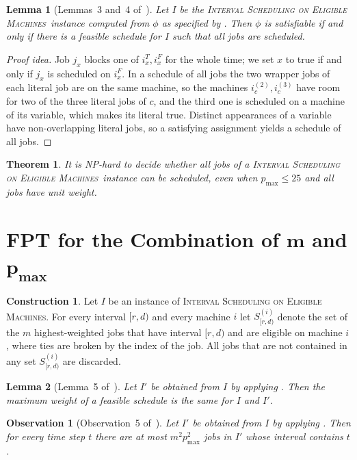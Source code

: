 \documentclass[11pt,a4paper]{article}
\newtheorem{theorem}{Theorem}
\newtheorem{lemma}{Lemma}
\newtheorem{observation}{Observation}
\theoremstyle{definition}
\newtheorem{construction}{Construction}
\newcommand{\pmax}{p_{\max}}
\newcommand{\ProbEM}{\textsc{Interval Scheduling on Eligible Machines}}
\newcommand{\NP}{\textnormal{\textsf{NP}}}
\begin{document}
\begin{lemma}[Lemmas~3 and~4 of~\cite{HIMS24}]\label{lem:nphcorr}
Let $I$ be the \ProbEM\ instance computed from $\phi$ as specified by .
Then $\phi$ is satisfiable if and only if there is a feasible schedule for $I$ such that
all jobs are scheduled.
\end{lemma}
\begin{proof}[Proof idea]
Job $j_x$ blocks one of $i_x^T,i_x^F$ for the whole time; we set $x$ to true if and only if
$j_x$ is scheduled on $i_x^F$. In a schedule of all jobs the two wrapper jobs of each
literal job are on the same machine, so the machines $i_c^{(2)},i_c^{(3)}$ have room for
two of the three literal jobs of $c$, and the third one is scheduled on a machine of its
variable, which makes its literal true. Distinct appearances of a variable have
non-overlapping literal jobs, so a satisfying assignment yields a schedule of all jobs.
\end{proof}

\begin{theorem}\label{thm:nph}
It is \NP-hard to decide whether all jobs of a \ProbEM\ instance can be scheduled, even
when $\pmax\le 25$ and all jobs have unit weight.
\end{theorem}

\section{\textsf{FPT} for the Combination of \texorpdfstring{$\boldsymbol{m}$ and $\boldsymbol{\pmax}$}{m and pmax}}\label{sec:FPTalt}

\begin{construction}\label{con:effective}
Let $I$ be an instance of \ProbEM. For every interval $[r,d)$ and every machine $i$ let
$S^{(i)}_{[r,d)}$ denote the set of the $m$ highest-weighted jobs that have interval
$[r,d)$ and are eligible on machine $i$, where ties are broken by the index of the job. All
jobs that are not contained in any set $S^{(i)}_{[r,d)}$ are discarded.
\end{construction}
\begin{lemma}[Lemma~5 of~\cite{HIMS24}]\label{lem:EM2EM}
Let $I'$ be obtained from $I$ by applying . Then the maximum weight of
a feasible schedule is the same for $I$ and $I'$.
\end{lemma}
\begin{observation}[Observation~5 of~\cite{HIMS24}]\label{obs:fpt}
Let $I'$ be obtained from $I$ by applying . Then for every time step
$t$ there are at most $m^2\pmax^2$ jobs in $I'$ whose interval contains $t$.
\end{observation}
\end{document}
